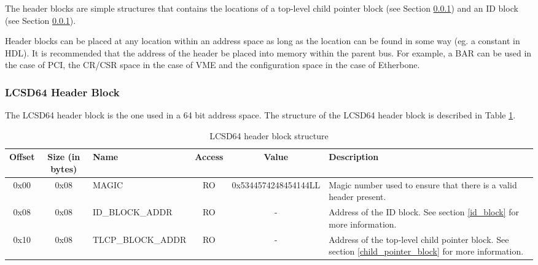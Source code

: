 \documentclass{article}
\begin{document}
The header blocks are simple structures that contains the locations of a top-level
child pointer block (see Section \ref{}) and an ID block (see Section \ref{}).

Header blocks can be placed at any location within an address space
as long as the location can be found in some way (eg. a constant in HDL).
It is recommended that the address of the header be placed into memory
within the parent bus. For example, a BAR can be used in the case of PCI,
the CR/CSR space in the case of VME and the configuration space in the case
of Etherbone.

\subsubsection{LCSD64 Header Block}
The LCSD64 header block is the one used in a 64 bit address space. The structure
of the LCSD64 header block is described in Table \ref{hdr_block_struct}.

\begin{center}
  \begin{savenotes}
    \begin{table}[!ht]\footnotesize
      \caption{LCSD64 header block structure}\label{hdr_block_struct}\centering
      \begin{tabular}{| c | c | l | c | c | p{5cm} |} \hline
      Offset & Size (in bytes) & Name & Access & Value & Description \\ \hline
      0x00 & 0x08 & MAGIC & RO & 0x5344574248454144LL & Magic number used to ensure that there is a valid header present. \\ \hline
      0x08 & 0x08 & ID\_BLOCK\_ADDR & RO & - & Address of the ID block. See section \ref{id_block} for more information. \\ \hline
      0x10 & 0x08 & TLCP\_BLOCK\_ADDR & RO & - & Address of the top-level child pointer block. See section \ref{child_pointer_block} for more information. \\ \hline
      \end{tabular}
    \end{table}
  \end{savenotes}
\end{center}
\end{document}
